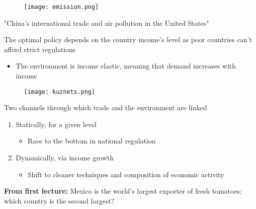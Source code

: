 \documentclass{beamer}
\begin{document}
\begin{frame}
  \begin{figure}
    \texttt{[image: emission.png]}
  \end{figure}
  "China's international trade and air pollution in the United States"
\end{frame}

\begin{frame}
  The optimal policy depends on the country income's level as poor countries can't afford strict regulations
  \begin{itemize}
    \item The environment is income elastic, meaning that demand increases with income
  \end{itemize}
\end{frame}

\begin{frame}
  \begin{figure}
    \texttt{[image: kuznets.png]}
  \end{figure}
\end{frame}

\begin{frame}
  Two channels through which trade and the environment are linked
  \medskip
  \begin{enumerate}
    \item Statically, for a given level
    \begin{itemize}
      \item Race to the bottom in national regulation 
    \end{itemize}
    \item Dynamically, via income growth
    \begin{itemize}
      \item Shift to cleaner techniques and composition of economic activity
    \end{itemize}
  \end{enumerate}
\end{frame}

\begin{frame}
 \textbf{From first lecture:} Mexico is the world’s largest exporter of fresh
tomatoes; which country is the second largest?
\end{frame}
\end{document}
